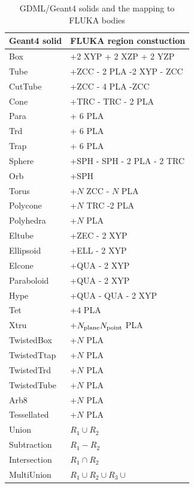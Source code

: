 \documentclass[final,5p,times,twocolumn]{elsarticle}
\begin{document}
\begin{table}[hbt!]
\centering
\begin{tabular}{ l  l  } \hline
Geant4 solid			& FLUKA region constuction		\\ \hline
Box					& +2 XYP + 2 XZP + 2 YZP 		\\
Tube					& +ZCC - 2 PLA -2 XYP - ZCC	 	\\
CutTube				& +ZCC - 4 PLA -ZCC			\\
Cone				& +TRC - TRC - 2 PLA 			\\
Para					& + 6 PLA						\\
Trd					& + 6 PLA						\\
Trap					& + 6 PLA						\\
Sphere				& +SPH - SPH  - 2 PLA - 2 TRC	\\
Orb					& +SPH						\\
Torus				& +$N$ ZCC  - $N$ PLA			\\
Polycone				& +$N$ TRC -2 PLA				\\
Polyhedra				& +$N$ PLA					\\
Eltube				& +ZEC  - 2 XYP				\\
Ellipsoid				& +ELL - 2 XYP		 			\\
Elcone				& +QUA - 2 XYP				\\
Paraboloid			& +QUA - 2 XYP				\\
Hype					& +QUA - QUA - 2 XYP			\\
Tet					& +4 PLA						\\
Xtru					& +$N_{\rm plane} N_{\rm point}$ PLA \\
TwistedBox			& +$N$ PLA					\\
TwistedTtap			& +$N$ PLA					\\
TwistedTrd			& +$N$ PLA				 	\\
TwistedTube			& +$N$ PLA					\\
Arb8					& +$N$ PLA					\\
Tessellated			& +$N$ PLA				 	\\
Union				& $R_1 \cup R_2$				\\
Subtraction			& $R_1 - R_2$					\\
Intersection			& $R_1 \cap R_2$				\\
MultiUnion			& $R_1 \cup R_2 \cup R_3 \cup$	\\ \hline
\end{tabular}
\label{tab:geant2fluka}
\caption{GDML/Geant4 solids and the mapping to FLUKA bodies}
\end{table}
\end{document}
